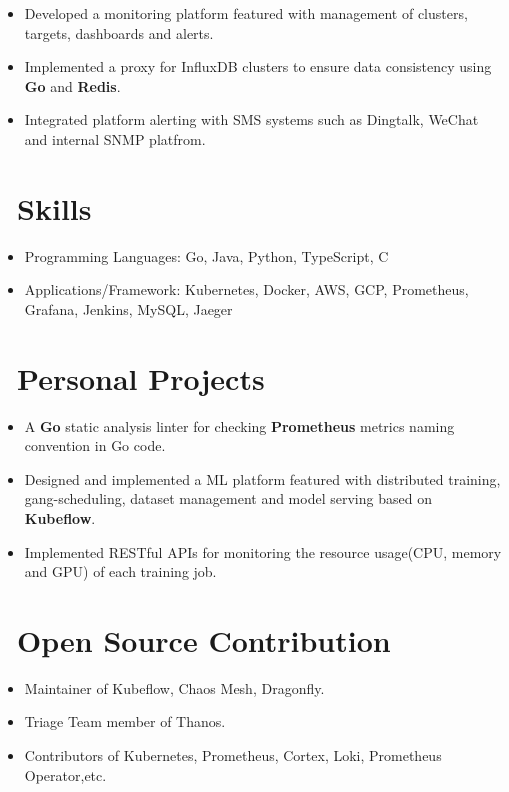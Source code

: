 \documentclass{resume}
\begin{document}
\begin{itemize}
  \item Developed a monitoring platform featured with management of clusters, targets, dashboards and alerts.
  \item Implemented a proxy for InfluxDB clusters to ensure data consistency using \textbf{Go} and \textbf{Redis}.
  \item Integrated platform alerting with SMS systems such as Dingtalk, WeChat and internal SNMP platfrom.
\end{itemize}

\section{\faKey\ Skills}
\begin{itemize}[parsep=0.5ex]
  \item Programming Languages: Go, Java, Python, TypeScript, C
  \item Applications/Framework: Kubernetes, Docker, AWS, GCP, Prometheus, Grafana, Jenkins, MySQL, Jaeger
\end{itemize}

\section{\faCogs\ Personal Projects}
\begin{itemize}
  \item A \textbf{Go} static analysis linter for checking \textbf{Prometheus} metrics naming convention in Go code.
\end{itemize}

\begin{itemize}
  \item Designed and implemented a ML platform featured with distributed training, gang-scheduling, dataset management and model serving based on \textbf{Kubeflow}.
  \item Implemented RESTful APIs for monitoring the resource usage(CPU, memory and GPU) of each training job.
\end{itemize}

\section{\faInfo\ Open Source Contribution}
\begin{itemize}[parsep=0.5ex]
  \item Maintainer of Kubeflow, Chaos Mesh, Dragonfly.
  \item Triage Team member of Thanos.
  \item Contributors of Kubernetes, Prometheus, Cortex, Loki, Prometheus Operator,etc.
\end{itemize}
\end{document}

